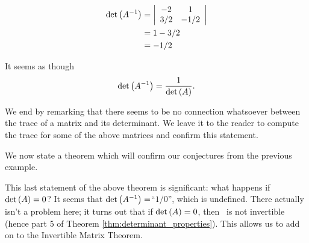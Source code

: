 {\begin{align*}
\det{\ttai} & = \bdt{cc} -2& 1\\ 3/2 & -1/2\edt\\
&=	1-3/2\\
&=-1/2
\end{align*}

It seems as though $$\det{\ttai} = \frac{1}{\det{\tta}}.$$

We end by remarking that there seems to be no connection whatsoever between the trace of a matrix and its determinant. We leave it to the reader to compute the trace for some of the above matrices and confirm this statement. \\ } %

We now state a theorem which will confirm our conjectures from the previous example. 


This last statement of the above theorem is significant: what happens if $\det{\tta} = 0$? It seems that $\det{\ttai} = $``$1/0$'', which is undefined. There actually isn't a problem here; it turns out that if $\det{\tta}=0$, then \tta\ is not invertible (hence part 5 of Theorem \ref{thm:determinant_properties}). This allows us to add on to the Invertible Matrix Theorem.


